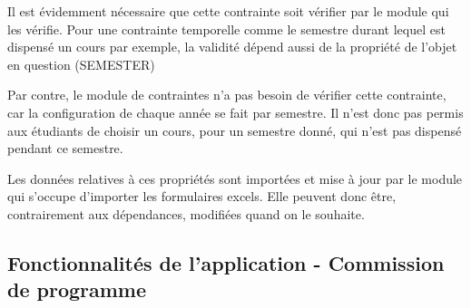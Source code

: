 Il est évidemment nécessaire que cette contrainte soit vérifier par le module qui les vérifie. Pour une contrainte temporelle comme le semestre durant lequel est dispensé un cours par exemple, la validité dépend aussi de la propriété de l'objet en question (SEMESTER)

Par contre, le module de contraintes n'a pas besoin de vérifier cette contrainte, car la configuration de chaque année se fait par semestre. Il n'est donc pas permis aux étudiants de choisir un cours, pour un semestre donné, qui n'est pas dispensé pendant ce semestre. 

Les données relatives à ces propriétés sont importées et mise à jour par le module qui s'occupe d'importer les formulaires excels. Elle peuvent donc être, contrairement aux dépendances, modifiées quand on le souhaite.  

\clearpage
\subsection{Fonctionnalités de l'application - Commission de programme}
